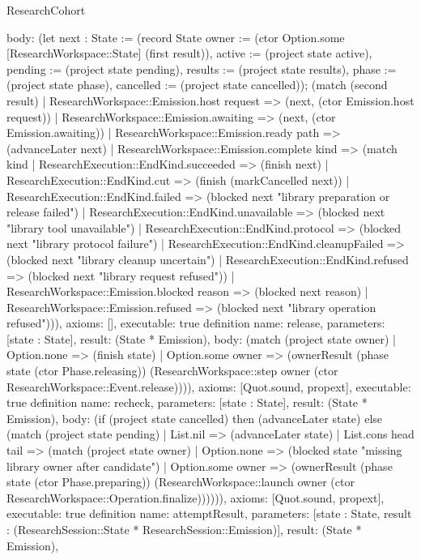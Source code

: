 \begin{lexlean}{ResearchCohort}
\begin{semanticmodule}
{ body: (let next : State := (record State {owner := (ctor Option.some [ResearchWorkspace::State] (first result)), active := (project state active), pending := (project state pending), results := (project state results), phase := (project state phase), cancelled := (project state cancelled)}); (match (second result) | ResearchWorkspace::Emission.host request => (next, (ctor Emission.host request)) | ResearchWorkspace::Emission.awaiting => (next, (ctor Emission.awaiting)) | ResearchWorkspace::Emission.ready path => (advanceLater next) | ResearchWorkspace::Emission.complete kind => (match kind | ResearchExecution::EndKind.succeeded => (finish next) | ResearchExecution::EndKind.cut => (finish (markCancelled next)) | ResearchExecution::EndKind.failed => (blocked next "library preparation or release failed") | ResearchExecution::EndKind.unavailable => (blocked next "library tool unavailable") | ResearchExecution::EndKind.protocol => (blocked next "library protocol failure") | ResearchExecution::EndKind.cleanupFailed => (blocked next "library cleanup uncertain") | ResearchExecution::EndKind.refused => (blocked next "library request refused")) | ResearchWorkspace::Emission.blocked reason => (blocked next reason) | ResearchWorkspace::Emission.refused => (blocked next "library operation refused"))),
 axioms: [],
 executable: true
}
definition{
 name: release,
 parameters: [state : State],
 result: (State * Emission),
 body: (match (project state owner) | Option.none => (finish state) | Option.some owner => (ownerResult (phase state (ctor Phase.releasing)) (ResearchWorkspace::step owner (ctor ResearchWorkspace::Event.release)))),
 axioms: [Quot.sound, propext],
 executable: true
}
definition{
 name: recheck,
 parameters: [state : State],
 result: (State * Emission),
 body: (if (project state cancelled) then (advanceLater state) else (match (project state pending) | List.nil => (advanceLater state) | List.cons head tail => (match (project state owner) | Option.none => (blocked state "missing library owner after candidate") | Option.some owner => (ownerResult (phase state (ctor Phase.preparing)) (ResearchWorkspace::launch owner (ctor ResearchWorkspace::Operation.finalize)))))),
 axioms: [Quot.sound, propext],
 executable: true
}
definition{
 name: attemptResult,
 parameters: [state : State, result : (ResearchSession::State * ResearchSession::Emission)],
 result: (State * Emission),
}
\end{semanticmodule}
\end{lexlean}

